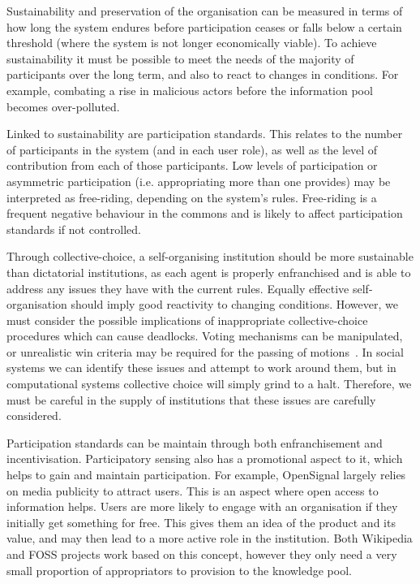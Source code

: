 Sustainability and preservation of the organisation can be measured in terms of how long the system endures before participation ceases or falls below a certain threshold (where the system is not longer economically viable). 
To achieve sustainability it must be possible to meet the needs of the majority of participants over the long term, and also to react to changes in conditions. 
For example, combating a rise in malicious actors before the information pool becomes over-polluted. 

Linked to sustainability are participation standards. 
This relates to the number of participants in the system (and in each user role), as well as the level of contribution from each of those participants. Low levels of participation or asymmetric participation (i.e. appropriating more than one provides) may be interpreted as free-riding, depending on the system's rules. 
Free-riding is a frequent negative behaviour in the commons and is likely to affect participation standards if not controlled.

Through collective-choice, a self-organising institution should be more sustainable than dictatorial institutions, as each agent is properly enfranchised and is able to address any issues they have with the current rules. 
Equally effective self-organisation should imply good reactivity to changing conditions. 
However, we must consider the possible implications of inappropriate collective-choice procedures which can cause deadlocks. 
Voting mechanisms can be manipulated, or unrealistic win criteria may be required for the passing of motions~\citep{Pitt2011b}. 
In social systems we can identify these issues and attempt to work around them, but in computational systems collective choice will simply grind to a halt. 
Therefore, we must be careful in the supply of institutions that these issues are carefully considered.

Participation standards can be maintain through both enfranchisement and incentivisation. 
Participatory sensing also has a promotional aspect to it, which helps to gain and maintain participation. 
For example, OpenSignal largely relies on media publicity to attract users. 
This is an aspect where open access to information helps. 
Users are more likely to engage with an organisation if they initially get something for free. 
This gives them an idea of the product and its value, and may then lead to a more active role in the institution. 
Both Wikipedia and FOSS projects work based on this concept, however they only need a very small proportion of appropriators to provision to the knowledge pool. 

